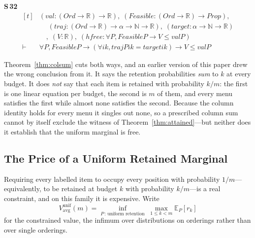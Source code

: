 \noindent\textbf{S\,32}\quad{}
{\footnotesize\[ \begin{aligned}[t]
&(\mathit{val} : (\mathit{Ord} \to \mathbb{R} ) \to \mathbb{R} ),\; (\mathit{Feasible} : (\mathit{Ord} \to \mathbb{R} ) \to \mathit{Prop}),\\
&\quad \; (\mathit{traj} : (\mathit{Ord} \to \mathbb{R} ) \to \alpha \to \mathbb{N} \to \mathbb{R} ),\; (\mathit{target} : \alpha \to \mathbb{N} \to \mathbb{R} )\\
&\quad ,\; (\mathit{V} : \mathbb{R} ),\; (\mathit{hfree} : \forall \mathit{P}, \mathit{Feasible} \mathit{P} \to \mathit{V} \leq \mathit{val} \mathit{P})\\
\vdash\;&\forall \mathit{P}, \mathit{Feasible} \mathit{P} \to (\forall \mathit{i} \mathit{k}, \mathit{traj} \mathit{P} \mathit{i} \mathit{k} = \mathit{target} \mathit{i} \mathit{k}) \to \mathit{V} \leq \mathit{val} \mathit{P}
\end{aligned} \]}


Theorem~\ref{thm:colsum} cuts both ways, and an earlier version of this paper drew the wrong
conclusion from it. It says the retention probabilities \emph{sum} to $k$ at every budget.
It does \emph{not} say that each item is retained with probability $k/m$: the first is one
linear equation per budget, the second is $m$ of them, and every menu satisfies the first
while almost none satisfies the second. Because the column identity holds for every menu it
singles out none, so a prescribed column sum cannot by itself exclude the witness of
Theorem~\ref{thm:attained}---but neither does it establish that the uniform marginal is free.


\subsection{The Price of a Uniform Retained Marginal}
\label{sec:unifretention}

Requiring every labelled item to occupy every position with probability $1/m$---equivalently,
to be retained at budget $k$ with probability $k/m$---is a real constraint, and on this family
it is expensive. Write
\[
V^{\mathrm{unif}}_{\mathrm{avg}}(m)
=\inf_{P\,:\,\text{uniform retention}}\;\max_{1\le k<m}\mathbb{E}_{P}[r_{k}]
\]
for the constrained value, the infimum over distributions on orderings rather than over
single orderings.

